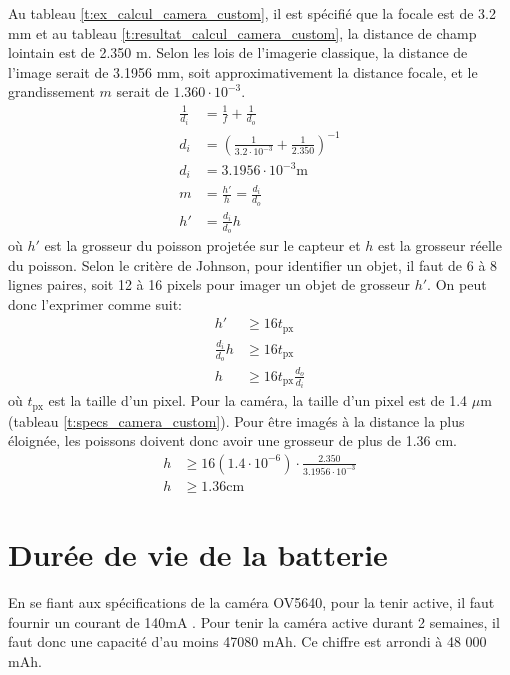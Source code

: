 Au tableau \ref{t:ex_calcul_camera_custom}, il est spécifié que la focale est de 3.2 mm et au tableau \ref{t:resultat_calcul_camera_custom}, la distance de champ lointain est de 2.350 m. Selon les lois de l'imagerie classique, la distance de l'image serait de 3.1956 mm, soit approximativement la distance focale, et le grandissement $m$ serait de $1.360\cdot10^{-3}$.
\begin{align}
    \frac{1}{d_i} &= \frac{1}{f} + \frac{1}{d_o}\\
    d_i &= \left( \frac{1}{3.2\cdot10^{-3}} + \frac{1}{2.350}\right)^{-1}\\
    d_i &= 3.1956\cdot10^{-3}\text{m}\\
    m &= \frac{h'}{h} = \frac{d_i}{d_o}\\
    h' &= \frac{d_i}{d_o}h
    \label{eq:imagerie}
\end{align}
où $h'$ est la grosseur du poisson projetée sur le capteur et $h$ est la grosseur réelle du poisson. Selon le critère de Johnson, pour identifier un objet, il faut de 6 à 8 lignes paires, soit 12 à 16 pixels pour imager un objet de grosseur $h'$. On peut donc l'exprimer comme suit:
\begin{align}
    h' &\geq 16 t_\text{px}\\
    \frac{d_i}{d_o}h &\geq 16 t_\text{px}\\
    h &\geq 16 t_\text{px} \frac{d_o}{d_i} 
    \label{eq:johnson}
\end{align}
où $t_\text{px}$ est la taille d'un pixel. Pour la caméra, la taille d'un pixel est de 1.4 $\mu$m (tableau \ref{t:specs_camera_custom}). Pour être imagés à la distance la plus éloignée, les poissons doivent donc avoir une grosseur de plus de 1.36 cm.
\begin{align*}
    h &\geq 16 (1.4\cdot10^{-6})\cdot  \frac{2.350}{3.1956\cdot10^{-3}}\\
    h &\geq 1.36 \text{cm}
\end{align*}

\section{Durée de vie de la batterie}
\label{annexe:duree_de_vie}

En se fiant aux spécifications de la caméra OV5640, pour la tenir active, il faut fournir un courant de 140mA \cite{OV5640_datasheet}. Pour tenir la caméra active durant 2 semaines, il faut donc une capacité d'au moins 47080 mAh. Ce chiffre est arrondi à 48 000 mAh.

